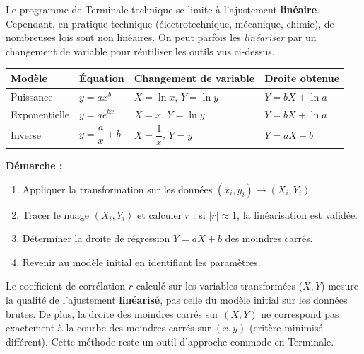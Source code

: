 \documentclass[11pt]{article}
\begin{document}
\begin{savaistu}
Le programme de Terminale technique se limite à l'ajustement \textbf{linéaire}. Cependant, en pratique technique (électrotechnique, mécanique, chimie), de nombreuses lois sont non linéaires. On peut parfois les \emph{linéariser} par un changement de variable pour réutiliser les outils vus ci-dessus.

\begin{center}
\begin{tabularx}{\linewidth}{|l|X|X|X|}
\hline
\rowcolor{popblueL} \textbf{Modèle} & \textbf{Équation} & \textbf{Changement de variable} & \textbf{Droite obtenue} \\
\hline
Puissance & $y = a x^b$ & $X = \ln x$, $Y = \ln y$ & $Y = b X + \ln a$ \\
\hline
Exponentielle & $y = a e^{bx}$ & $X = x$, $Y = \ln y$ & $Y = b X + \ln a$ \\
\hline
Inverse & $y = \dfrac{a}{x} + b$ & $X = \dfrac{1}{x}$, $Y = y$ & $Y = a X + b$ \\
\hline
\end{tabularx}
\end{center}

\textbf{Démarche :}
\begin{enumerate}
\item Appliquer la transformation sur les données $(x_i, y_i) \to (X_i, Y_i)$.
\item Tracer le nuage $(X_i, Y_i)$ et calculer $r$ : si $|r| \approx 1$, la linéarisation est validée.
\item Déterminer la droite de régression $Y = a X + b$ des moindres carrés.
\item Revenir au modèle initial en identifiant les paramètres.
\end{enumerate}

\begin{attention}[Piège]
Le coefficient de corrélation $r$ calculé sur les variables transformées ($X, Y$) mesure la qualité de l'ajustement \textbf{linéarisé}, pas celle du modèle initial sur les données brutes. De plus, la droite des moindres carrés sur $(X,Y)$ ne correspond pas exactement à la courbe des moindres carrés sur $(x,y)$ (critère minimisé différent). Cette méthode reste un outil d'approche commode en Terminale.
\end{attention}
\end{savaistu}

\newpage
\end{document}
